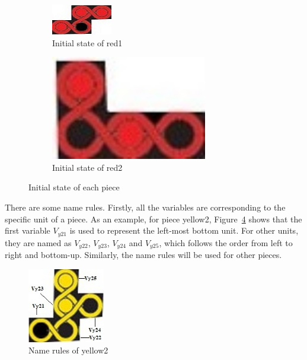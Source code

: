 \begin{figure}[htbp]
\begin{subfigure}[b]{.24\textwidth}
\centering
\includegraphics[width =\textwidth]{figs/red1.jpg}
\caption{Initial state of red1}
  \label{fig:2Dred1}
\end{subfigure}
\begin{subfigure}[b]{.24\textwidth}
\centering
\includegraphics[width=0.75\textwidth]{figs/red2.jpg}
\caption{Initial state of red2}
  \label{fig:2Dred2}
\end{subfigure}
\caption{Initial state of each piece}
  \label{fig:allinit}
\end{figure}
There are some name rules. Firstly, all the variables are corresponding to the specific unit of a piece. As an example, for piece yellow2, Figure~\ref{fig:namerules} shows that the first variable $V_{y21}$ is used to represent the left-most bottom unit. For other units, they are named as $V_{y22}$, $V_{y23}$, $V_{y24}$ and $V_{y25}$, which follows the order from left to right and bottom-up. Similarly, the name rules will be used for other pieces. 
\begin{figure}[htbp]
    \centering
    \includegraphics[width=0.3\textwidth]{figs/example.jpg}
    \caption{Name rules of yellow2}
    \label{fig:namerules}
\end{figure}
